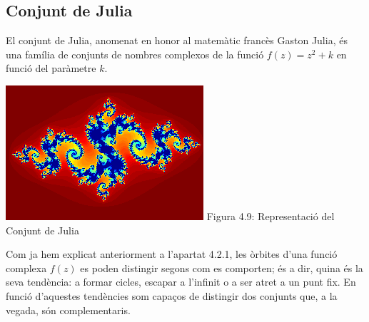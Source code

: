 \documentclass[12pt]{report}
\begin{document}
\subsection{Conjunt de Julia}
El conjunt de Julia, anomenat en honor al matemàtic francès Gaston Julia, és una família de conjunts de nombres complexos de la funció $f(z)=z^2+k$ en funció del paràmetre $k$.
\begin{center}
    \includegraphics[width=1 \textwidth]{Julia.png}
    Figura 4.9: Representació del Conjunt de Julia
\end{center}
Com ja hem explicat anteriorment a l'apartat 4.2.1, les òrbites d'una funció complexa $f(z)$ es poden distingir segons com es comporten; és a dir, quina és la seva tendència: a formar cicles, escapar a l'infinit o a ser atret a un punt fix.
\newline
En funció d'aquestes tendències som capaços de distingir dos conjunts que, a la vegada, són complementaris.
\end{document}
